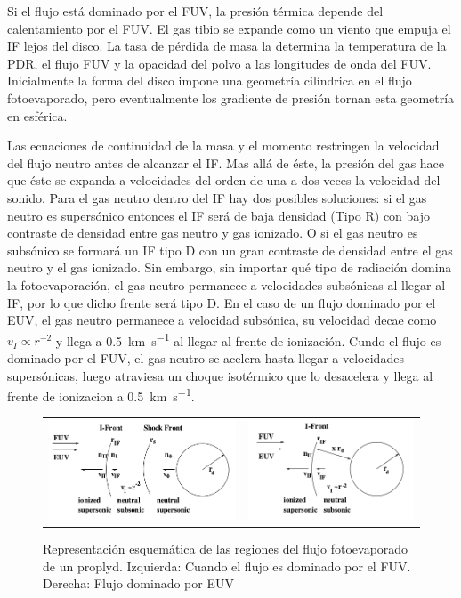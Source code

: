 Si el flujo está dominado por el FUV, la presión térmica depende del calentamiento por el FUV. El gas tibio se expande como un viento que empuja el IF lejos del disco. La tasa de pérdida de masa la determina la temperatura de la PDR, el flujo FUV y la opacidad del polvo a las longitudes de onda del FUV. Inicialmente la forma del disco impone una geometría cilíndrica en el flujo fotoevaporado, pero eventualmente los gradiente de presión tornan esta geometría en esférica.

Las ecuaciones de continuidad de la masa y el momento restringen la velocidad del flujo neutro antes de alcanzar el IF. Mas allá de éste, la presión del gas hace que éste se expanda a velocidades del orden de una a dos veces la velocidad del sonido. Para el gas neutro dentro del IF hay dos posibles soluciones: si el gas neutro es supersónico entonces el IF será de baja densidad (Tipo R) con bajo contraste de densidad entre gas neutro y gas ionizado. O si el gas neutro es subsónico se formará un IF tipo D con un gran contraste de densidad entre el gas neutro y el gas ionizado. Sin embargo, sin importar qué tipo de radiación domina la fotoevaporación, el gas neutro permanece a velocidades subsónicas al llegar al IF, por lo que dicho frente será tipo D. En el caso de un flujo dominado por el EUV, el gas neutro permanece a velocidad subsónica, su velocidad decae como $v_I \propto r^{-2}$ y llega a \SI{0.5}{km.s^{-1}} al llegar al frente de ionización. Cundo el flujo es dominado por el FUV, el gas neutro se acelera hasta llegar a velocidades supersónicas, luego atraviesa un choque isotérmico que lo desacelera y llega al frente de ionizacion a \SI{0.5}{km.s^{-1}}.

  \begin{figure}
    \begin{tabular}{cc}
      \includegraphics[width=0.5\linewidth]{./Figures/Johnstone-2} &
      \includegraphics[width=0.5\linewidth]{./Figures/Johnstone-3}
    \end{tabular}
    \label{fig:EUV-FUV-IF}
    \caption{Representación esquemática de las regiones del flujo fotoevaporado de un proplyd. Izquierda: Cuando el flujo es dominado por el FUV. Derecha: Flujo dominado por EUV \citep{Johnstone:1998}}
  \end{figure}
  

